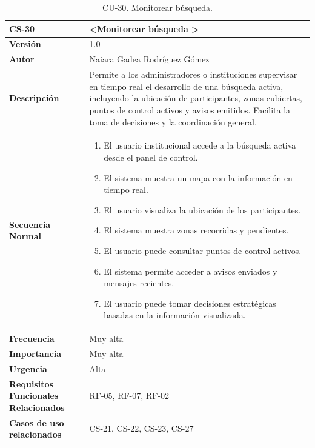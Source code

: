 \begin{table}[htbp] %
\centering
\begin{tabular}{ |m{3cm}|m{11cm}|  } 
\hline
\cellcolor[HTML]{B9E3F0}\centering\textbf{CS-30} & \cellcolor[HTML]{B9E3F0}\textbf{\textless Monitorear búsqueda \textgreater}\\

\hline
\cellcolor[HTML]{EFEFEF}\textbf{Versión}             & 1.0  \\
\hline
\cellcolor[HTML]{EFEFEF}\textbf{Autor}                & Naiara Gadea Rodríguez Gómez\\
\hline
\cellcolor[HTML]{EFEFEF}\textbf{Descripción}                & {Permite a los administradores o instituciones supervisar en tiempo real el desarrollo de una búsqueda activa, incluyendo la ubicación de participantes, zonas cubiertas, puntos de control activos y avisos emitidos. Facilita la toma de decisiones y la coordinación general.}\\
\hline
\cellcolor[HTML]{EFEFEF}\textbf{Secuencia \newline Normal}                &                 
        \begin{enumerate}
			\item El usuario institucional accede a la búsqueda activa desde el panel de control.
			\item El sistema muestra un mapa con la información en tiempo real.
			\item El usuario visualiza la ubicación de los participantes.
			\item El sistema muestra zonas recorridas y pendientes.
			\item El usuario puede consultar puntos de control activos.
			\item El sistema permite acceder a avisos enviados y mensajes recientes.
			\item El usuario puede tomar decisiones estratégicas basadas en la información visualizada.
		\end{enumerate}\\
\hline
\cellcolor[HTML]{EFEFEF}\textbf{Frecuencia}                & Muy alta\\
\hline
\cellcolor[HTML]{EFEFEF}\textbf{Importancia}                & Muy alta\\
\hline
\cellcolor[HTML]{EFEFEF}\textbf{Urgencia}                & Alta\\
\hline
\cellcolor[HTML]{EFEFEF}\textbf{Requisitos Funcionales Relacionados}                & {RF-05, RF-07, RF-02}\\
\hline
\cellcolor[HTML]{EFEFEF}\textbf{Casos de uso relacionados}                & {CS-21, CS-22, CS-23, CS-27}\\
\hline
\end{tabular}
\caption{CU-30. Monitorear búsqueda.}
\end{table}